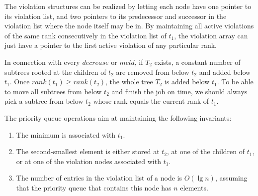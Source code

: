 \documentclass{llncs}
\newcommand{\rank}{\mbox{$\mathit{rank}$}}
\newcommand{\Decrease}{\mbox{$\mathit{decrease}$}}
\newcommand{\Meld}{\mbox{$\mathit{meld}$}}
\begin{document}
The violation structures can be realized by letting each node have one
pointer to its violation list, and two pointers to its predecessor and
successor in the violation list where the node itself may be in. By
maintaining all active violations of the same rank consecutively in
the violation list of $t_1$, the violation array can just have a
pointer to the first active violation of any particular rank.

In connection with every \Decrease{} or \Meld{}, if $T_2$ exists, a constant number of subtrees 
rooted at the children of $t_2$ are removed from below $t_2$ and added below $t_1$.  
Once $\rank{}(t_1)\geq \rank{}(t_2)$, the whole tree $T_2$ is added below $t_1$.
To be able to move all subtrees from below $t_2$ and
finish the job on time, we should always pick a subtree
from below $t_2$ whose rank equals the current rank of $t_1$.  

The priority queue operations aim at maintaining the following invariants:

\begin{enumerate}
\vspace{-.1in}
\item
The minimum is associated with $t_1$.  
\item
The second-smallest element is either stored at $t_2$, at one of the children of
$t_1$, or at one of the violation nodes associated with $t_1$.
\item
The number of entries in the violation list of a node is $O(\lg n)$,
assuming that the priority queue that contains this node has $n$ elements.
\vspace{-.05in}
\end{enumerate}
\end{document}

